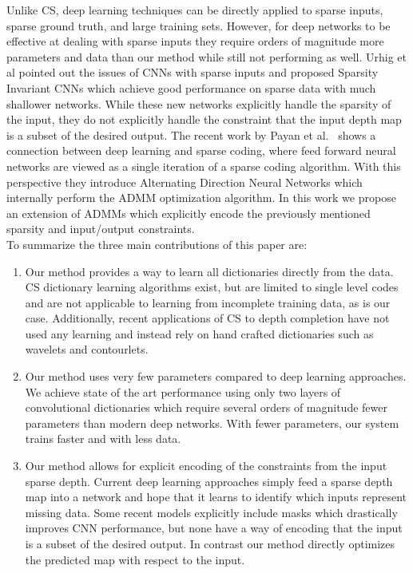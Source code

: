   Unlike CS, deep learning techniques can be directly applied to sparse inputs, sparse ground truth, and large training sets. However, for deep networks to be effective at dealing with sparse inputs they require orders of magnitude more parameters and data than our method while still not performing as well. Urhig et al pointed out the issues of CNNs with sparse inputs and proposed Sparsity Invariant CNNs which achieve good performance on sparse data with much shallower networks. While these new networks explicitly handle the sparsity of the input, they do not explicitly handle the constraint that the input depth map is a subset of the desired output. The recent work by Payan et al.~\cite{papyan}  shows a connection between deep learning and sparse coding, where feed forward neural networks are viewed as a single iteration of a sparse coding algorithm. With this perspective they introduce Alternating Direction Neural Networks which internally perform the ADMM optimization algorithm. In this work we propose an extension of ADMMs which explicitly encode the previously mentioned sparsity and input/output constraints.\\
  To summarize the three main contributions of this paper are:
  \begin{enumerate}
    \item Our method provides a way to learn all dictionaries directly from the data. CS dictionary learning algorithms exist, but are limited to single level codes and are not applicable to learning from incomplete training data, as is our case. Additionally, recent applications of CS to depth completion have not used any learning and instead rely on hand crafted dictionaries such as wavelets and contourlets.
  \item Our method uses very few parameters compared to deep learning approaches. We achieve state of the art performance using only two layers of convolutional dictionaries which require several orders of magnitude fewer parameters than modern deep networks. With fewer parameters, our system trains faster and with less data.
  \item Our method allows for explicit encoding of the constraints from the input sparse depth. Current deep learning approaches simply feed a sparse depth map into a network and hope that it learns to identify which inputs represent missing data. Some recent models explicitly include masks which drastically improves CNN performance, but none have a way of encoding that the input is a subset of the desired output. In contrast our method directly optimizes the predicted map with respect to the input.
  \end{enumerate}
  